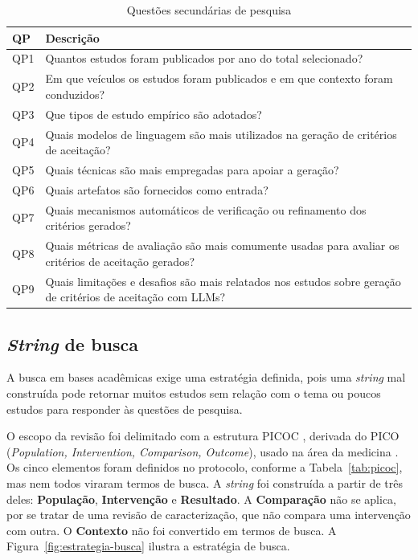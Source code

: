 \begin{table}[H]
  \centering
  \caption{Questões secundárias de pesquisa}
  \label{tab:qps}
  \small
  \begin{tabular}{|p{}|p{}|}
    \hline
    \textbf{QP} & \textbf{Descrição} \\ \hline
    QP1 & Quantos estudos foram publicados por ano do total selecionado? \\ \hline
    QP2 & Em que veículos os estudos foram publicados e em que contexto foram conduzidos? \\ \hline
    QP3 & Que tipos de estudo empírico são adotados? \\ \hline
    QP4 & Quais modelos de linguagem são mais utilizados na geração de critérios de aceitação? \\ \hline
    QP5 & Quais técnicas são mais empregadas para apoiar a geração? \\ \hline
    QP6 & Quais artefatos são fornecidos como entrada? \\ \hline
    QP7 & Quais mecanismos automáticos de verificação ou refinamento dos critérios gerados? \\ \hline
    QP8 & Quais métricas de avaliação são mais comumente usadas para avaliar os critérios de aceitação gerados? \\ \hline
    QP9 & Quais limitações e desafios são mais relatados nos estudos sobre geração de critérios de aceitação com LLMs? \\ \hline
  \end{tabular}
\end{table}

\subsection{\textit{String} de busca}
\label{sec:string}

A busca em bases acadêmicas exige uma estratégia definida, pois uma \textit{string} mal construída pode retornar muitos estudos sem relação com o tema ou poucos estudos para responder às questões de pesquisa.

O escopo da revisão foi delimitado com a estrutura PICOC \cite{kitchenham2007}, derivada do PICO (\textit{Population, Intervention, Comparison, Outcome}), usado na área da medicina \cite{pai2004}. Os cinco elementos foram definidos no protocolo, conforme a Tabela~\ref{tab:picoc}, mas nem todos viraram termos de busca. A \textit{string} foi construída a partir de três deles: \textbf{População}, \textbf{Intervenção} e \textbf{Resultado}. A \textbf{Comparação} não se aplica, por se tratar de uma revisão de caracterização, que não compara uma intervenção com outra. O \textbf{Contexto} não foi convertido em termos de busca. A Figura~\ref{fig:estrategia-busca} ilustra a estratégia de busca.

